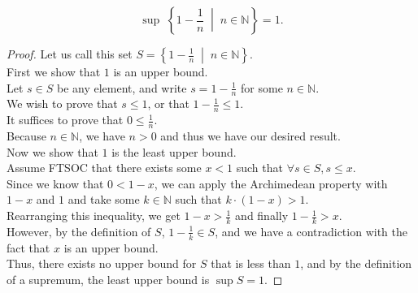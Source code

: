 \documentclass{article}
\newenvironment{theorem}[1]{\renewcommand\theinnercustomthm{#1}\innercustomthm}
  {\endinnercustomthm}
\begin{document}
\newpage{}
\begin{theorem}{5}
    \[\sup\;\left\{1-\frac{1}{n} \;\middle|\; n \in \mathbb N\right\} = 1.\]    
\end{theorem}
\begin{proof}
    Let us call this set $S =\left\{1-\frac{1}{n} \;\middle|\; n \in \mathbb N\right\}$. \\
    First we show that $1$ is an upper bound. \\
    Let $s \in S$ be any element, and write $s = 1 - \frac{1}{n}$ for some $n \in \mathbb N$. \\
    We wish to prove that $s \le 1$, or that $1 - \frac{1}{n} \le 1$. \\ It suffices to prove that $0 \le \frac{1}{n}$. \\
    Because $n \in \mathbb N$, we have $n > 0$ and thus we have our desired result. \\
    Now we show that $1$ is the least upper bound. \\
    Assume FTSOC that there exists some $x < 1$ such that $\forall s \in S,s \le x$. \\
    Since we know that $0 < 1 - x$, we can apply the Archimedean property with $1-x$ and $1$ and take some $k \in \mathbb N$ such that $k \cdot (1 - x) > 1$. \\
    Rearranging this inequality, we get $1-x>\frac{1}{k}$ and finally $1-\frac{1}{k} > x$. \\
    However, by the definition of $S$, $1-\frac{1}{k} \in S$, and we have a contradiction with the fact that $x$ is an upper bound. \\
    Thus, there exists no upper bound for $S$ that is less than $1$, and by the definition of a supremum, the least upper bound is $\sup S = 1$.
\end{proof}
\end{document}
